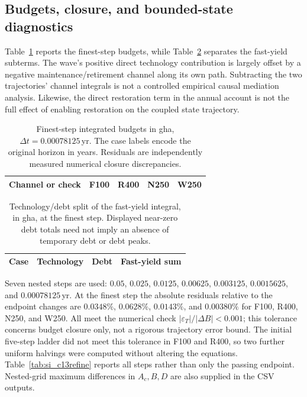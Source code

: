 \documentclass[11pt,a4paper]{article}
\begin{document}
\subsection{Budgets, closure, and bounded-state diagnostics}

Table~\ref{tab:si_c13budget} reports the finest-step budgets, while Table~\ref{tab:si_c13split} separates the fast-yield subterms. The wave's positive direct technology contribution is largely offset by a negative maintenance/retirement channel along its own path. Subtracting the two trajectories' channel integrals is not a controlled empirical causal mediation analysis. Likewise, the direct restoration term in the annual account is not the full effect of enabling restoration on the coupled state trajectory.

\begin{table}[htbp]
\centering\small
\caption{Finest-step integrated budgets in gha, $\Delta t=0.00078125$\,yr. The case labels encode the original horizon in years. Residuals are independently measured numerical closure discrepancies.}
\label{tab:si_c13budget}
\begin{tabular}{lrrrr}
\toprule
Channel or check & F100 & R400 & N250 & W250 \\
\midrule

\end{tabular}
\end{table}

\begin{table}[htbp]
\centering\small
\caption{Technology/debt split of the fast-yield integral, in gha, at the finest step. Displayed near-zero debt totals need not imply an absence of temporary debt or debt peaks.}
\label{tab:si_c13split}
\begin{tabular}{lrrr}
\toprule
Case & Technology & Debt & Fast-yield sum \\
\midrule

\end{tabular}
\end{table}

Seven nested steps are used: $0.05$, $0.025$, $0.0125$, $0.00625$, $0.003125$, $0.0015625$, and $0.00078125$\,yr. At the finest step the absolute residuals relative to the endpoint changes are $0.0348\%$, $0.0628\%$, $0.0143\%$, and $0.00380\%$ for F100, R400, N250, and W250. All meet the numerical check $|\varepsilon_T|/|\Delta B|<0.001$; this tolerance concerns budget closure only, not a rigorous trajectory error bound. The initial five-step ladder did not meet this tolerance in F100 and R400, so two further uniform halvings were computed without altering the equations. Table~\ref{tab:si_c13refine} reports all steps rather than only the passing endpoint. Nested-grid maximum differences in $A_c,B,D$ are also supplied in the CSV outputs.
\end{document}
